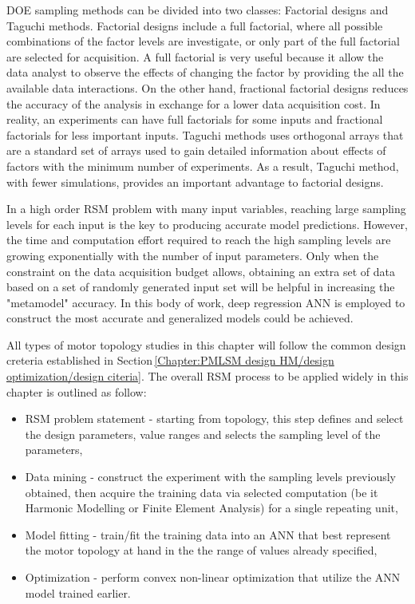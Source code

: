         
        \ac{DOE} sampling methods can be divided into two classes: Factorial designs and Taguchi methods. Factorial designs include a full factorial, where all possible combinations of the factor levels are investigate, or only part of the full factorial are selected for acquisition. A full factorial is very useful because it allow the data analyst to observe the effects of changing the factor by providing the all the available data interactions. On the other hand, fractional factorial designs reduces the accuracy of the analysis in exchange for a lower data acquisition cost. In reality, an experiments can have full factorials for some inputs and fractional factorials for less important inputs. Taguchi methods uses orthogonal arrays that are a standard set of arrays used to gain detailed information about effects of factors with the minimum number of experiments. As a result, Taguchi method, with fewer simulations, provides an important advantage to factorial designs. 
        
        
        In a high order \ac{RSM} problem  with many input variables, reaching large sampling levels for each input is the key to producing accurate model predictions. However, the time and computation effort required to reach the high sampling levels are growing exponentially with the number of input parameters. Only when the constraint on the data acquisition budget allows, obtaining an extra set of data based on a set of randomly generated input set will be helpful in increasing the "metamodel" accuracy. In this body of work, deep regression \acf{ANN} is employed to construct the most accurate and generalized models could be achieved.
        
        
        All types of motor topology studies in this chapter will follow the common design creteria established in Section\,\ref{Chapter:PMLSM design HM/design optimization/design citeria}. The overall \ac{RSM} process to be applied widely in this chapter is outlined as follow:
        
        
        \begin{itemize}
            \item RSM problem statement - starting from topology, this step defines and select the design parameters, value ranges and selects the sampling level of the parameters,
            \item Data mining - construct the experiment with the sampling levels previously obtained, then acquire the training data via selected computation (be it Harmonic Modelling or Finite Element Analysis) for a single repeating unit,
            \item Model fitting - train/fit the training data into an \ac{ANN} that best represent the motor topology at hand in the the range of values already specified,
            \item Optimization - perform convex non-linear optimization that utilize the \ac{ANN} model trained earlier.
        \end{itemize}
        

